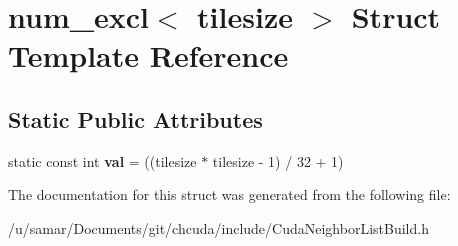 \hypertarget{structnum__excl}{}\section{num\+\_\+excl$<$ tilesize $>$ Struct Template Reference}
\label{structnum__excl}
\subsection*{Static Public Attributes}
\begin{DoxyCompactItemize}
\item 
\hypertarget{structnum__excl_abeb7d90de252d629164350568920ac58}{}\label{structnum__excl_abeb7d90de252d629164350568920ac58} 
static const int {\bfseries val} = ((tilesize $\ast$ tilesize -\/ 1) / 32 + 1)
\end{DoxyCompactItemize}


The documentation for this struct was generated from the following file\+:\begin{DoxyCompactItemize}
\item 
/u/samar/\+Documents/git/chcuda/include/Cuda\+Neighbor\+List\+Build.\+h\end{DoxyCompactItemize}
